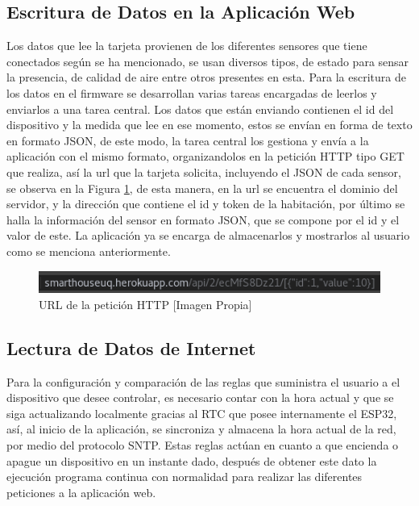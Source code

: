 \subsection{Escritura de Datos en la Aplicación Web}

Los datos que lee la tarjeta provienen de los diferentes sensores que tiene conectados según se ha mencionado, se usan diversos tipos, de estado para sensar la presencia, de calidad de aire entre otros presentes en esta. Para la escritura de los datos en el firmware se desarrollan varias tareas encargadas de leerlos y enviarlos a una tarea central. Los datos que están enviando contienen el id del dispositivo y la medida que lee en ese momento, estos se envían en forma de texto en formato JSON, de este modo, la tarea central los gestiona y envía a la aplicación con el mismo formato, organizandolos en la petición HTTP tipo GET que realiza, así la url que la tarjeta solicita, incluyendo el JSON de cada sensor, se observa en la Figura \ref{fig:json}, de esta manera, en la url se encuentra el dominio del servidor, y la dirección que contiene el id y token de la habitación, por último se halla la información del sensor en formato JSON, que se compone por el id y el valor de este. La aplicación ya se encarga de almacenarlos y mostrarlos al usuario como se menciona anteriormente.

\begin{figure}[H]
	\centering
	\caption{URL de la petición HTTP [Imagen Propia]}
	\label{fig:json}
	\includegraphics[width=0.7\linewidth]{Imagenes/JSON}
\end{figure}


\subsection{Lectura de Datos de Internet}

Para la configuración y comparación de las reglas que suministra el usuario a el dispositivo que desee controlar, es necesario contar con la hora actual y que se siga actualizando localmente gracias al RTC que posee internamente el ESP32, así, al inicio de la aplicación, se sincroniza y almacena la hora actual de la red, por medio del protocolo SNTP. Estas reglas actúan en cuanto a que encienda o apague un dispositivo en un instante dado, después de obtener este dato la ejecución programa continua con normalidad para realizar las diferentes peticiones a la aplicación web.\\

